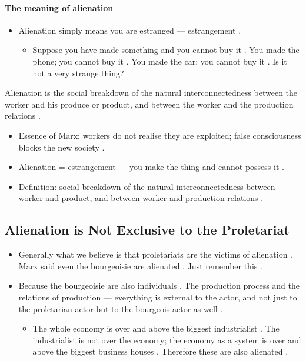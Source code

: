 \paragraph{The meaning of alienation}
\begin{itemize}
    \item Alienation simply means you are estranged --- estrangement .
    \begin{itemize}
        \item Suppose you have made something and you cannot buy it . You made the phone; you cannot buy it . You made the car; you cannot buy it . Is it not a very strange thing? 
    \end{itemize}
\end{itemize}

\begin{KeyConcept}
Alienation is the social breakdown of the natural interconnectedness between the worker and his produce or product, and between the worker and the production relations .
\end{KeyConcept}

\begin{QuickRevision}
\begin{itemize}
    \item Essence of Marx: workers do not realise they are exploited; false consciousness blocks the new society .
    \item Alienation = estrangement --- you make the thing and cannot possess it .
    \item Definition: social breakdown of the natural interconnectedness between worker and product, and between worker and production relations .
\end{itemize}
\end{QuickRevision}

\subsection{Alienation is Not Exclusive to the Proletariat}
\begin{itemize}
    \item Generally what we believe is that proletariats are the victims of alienation . Marx said even the bourgeoisie are alienated . Just remember this .
    \item Because the bourgeoisie are also individuals . The production process and the relations of production --- everything is external to the actor, and not just to the proletarian actor but to the bourgeois actor as well .
    \begin{itemize}
        \item The whole economy is over and above the biggest industrialist . The industrialist is not over the economy; the economy as a system is over and above the biggest business houses . Therefore these are also alienated .
    \end{itemize}
\end{itemize}

